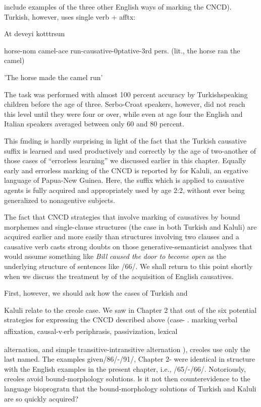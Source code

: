
include examples of the three other English ways of marking the CNCD). Turkish, however, uses single verb + afftx:

\ea\label{ex:76}
 At deveyi kotttrsun
\glt
\z

horse-nom camel-ace run-causative-0ptative-3rd pers. (lit., the horse ran the camel)

'The horse made the camel run'

The task was performed with almost 100 percent accuracy by Turkish\-speaking children before the age of three. Serbo-Croat speakers, how\-ever, did not reach this level until they were four or over, while even at age four the English and Italian speakers averaged between only 60 and 80 percent.

This fmding is hardly surprising in light of the fact that the Turkish causative suffix is learned and used productively and correctly by the age of two{}-another of those cases of ``errorless learning'' we discussed earlier in this chapter. Equally early and errorless marking of the CNCD is reported by \citet{Schiefflin1979} for Kaluli, an ergative language of Papua-New Guinea. Here, the suffix which is applied to causative agents is fully acquired and appropriately used by age 2:2, withont ever being generalized to nonagentive subjects.

The fact that CNCD strategies that involve marking of causatives by bound morphemes and single-clause structures (the case in both Turkish and Kaluli) are acquired earlier and more easily than struc\-tures involving two clauses and a causative verb casts strong doubts on those generative-semanticist analyses that would assume something like \textit{Bill} \textit{caused the} \textit{door to} \textit{become} \textit{open} as the underlying structure of sentences like /66/. We shall return to this point shortly when we discuss the treatment by \citet{Bowerman1974} of the acquisition of English causatives.

First, however, we should ask how the cases of Turkish and

Kaluli relate to the creole case. We saw in Chapter 2 that out of the six potential strategies for expressing the CNCD described above (case- . marking\textsubscript{,}verbal affixation, causal{}-v\textsubscript{'}erb periphrasis, passivization, lexical


alternation, and simple transitive-intransitive alternation ), creoles use only the last named. The examples given/86/-/91/, Chapter 2- were identical in structure with the English examples in the present chapter, i.e., /65/-/66/. Notoriously, creoles avoid bound-morphology solutions. ls it not then counterevidence to the language bioprogratn that the bound-morphology solutions of Turkish and Kaluli are so quickly acquired?


